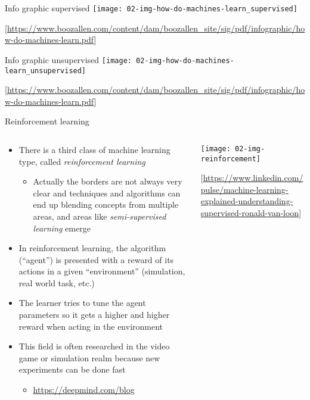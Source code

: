  \begin{frame}{Info graphic supervised}
      \texttt{[image: 02-img-how-do-machines-learn\_supervised]}
      \begin{center}
        \tiny[\url{https://www.boozallen.com/content/dam/boozallen_site/sig/pdf/infographic/how-do-machines-learn.pdf}]
      \end{center}
  \end{frame}

  \begin{frame}{Info graphic unsupervised}
      \texttt{[image: 02-img-how-do-machines-learn\_unsupervised]}
      \begin{center}
        \tiny[\url{https://www.boozallen.com/content/dam/boozallen_site/sig/pdf/infographic/how-do-machines-learn.pdf}]
      \end{center}
  \end{frame}

  \begin{frame}{Reinforcement learning}
    \begin{columns}
      \begin{column}{0.5\textwidth}
        \begin{itemize}
          \item There is a third class of machine learning type, called \emph{reinforcement learning}
          \begin{itemize}
            \item Actually the borders are not always very clear and techniques and algorithms can end up blending concepts from multiple areas, and areas like \emph{semi-supervised learning} emerge
          \end{itemize}
          \item In reinforcement learning, the algorithm (\enquote{agent}) is presented with a reward of its actions in a given \enquote{environment} (simulation, real world task, etc.)
          \item The learner tries to tune the agent parameters so it gets a higher and higher reward when acting in the environment
          \item This field is often researched in the video game or simulation realm because new experiments can be done fast
          \begin{itemize}
            \item \url{https://deepmind.com/blog}
          \end{itemize}
        \end{itemize}
      \end{column}
      \begin{column}{0.5\textwidth}
        \texttt{[image: 02-img-reinforcement]}
        \begin{center}
          \tiny[\url{https://www.linkedin.com/pulse/machine-learning-explained-understanding-supervised-ronald-van-loon}]
        \end{center}
      \end{column}
    \end{columns}
  \end{frame}


